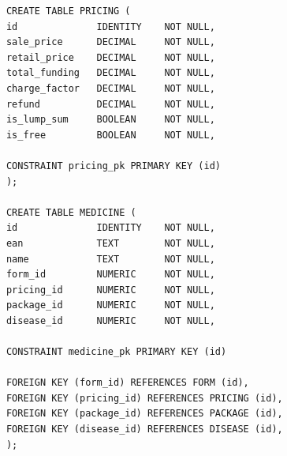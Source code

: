 \documentclass{article}
\begin{document}
  \begin{minipage}{.45\textwidth}
    \begin{lstlisting}
      CREATE TABLE PRICING (
      id              IDENTITY    NOT NULL,
      sale_price      DECIMAL     NOT NULL,
      retail_price    DECIMAL     NOT NULL,
      total_funding   DECIMAL     NOT NULL,
      charge_factor   DECIMAL     NOT NULL,
      refund          DECIMAL     NOT NULL,
      is_lump_sum     BOOLEAN     NOT NULL,
      is_free         BOOLEAN     NOT NULL,

      CONSTRAINT pricing_pk PRIMARY KEY (id)
      );

      CREATE TABLE MEDICINE (
      id              IDENTITY    NOT NULL,
      ean             TEXT        NOT NULL,
      name            TEXT        NOT NULL,
      form_id         NUMERIC     NOT NULL,
      pricing_id      NUMERIC     NOT NULL,
      package_id      NUMERIC     NOT NULL,
      disease_id      NUMERIC     NOT NULL,

      CONSTRAINT medicine_pk PRIMARY KEY (id)

      FOREIGN KEY (form_id) REFERENCES FORM (id),
      FOREIGN KEY (pricing_id) REFERENCES PRICING (id),
      FOREIGN KEY (package_id) REFERENCES PACKAGE (id),
      FOREIGN KEY (disease_id) REFERENCES DISEASE (id),
      );
    \end{lstlisting}
  \end{minipage}
\end{document}
